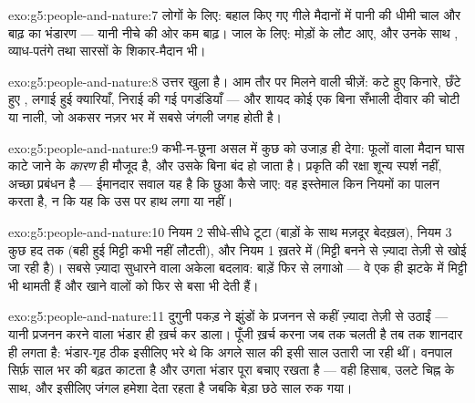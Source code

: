 \begin{solution}{exo:g5:people-and-nature:7}
लोगों के लिए: बहाल किए गए गीले मैदानों में पानी की धीमी चाल और बाढ़ का
भंडारण --- यानी नीचे की ओर कम बाढ़। जाल के लिए: मोड़ों के  लौट आए,
और उनके साथ , व्याध-पतंगे तथा सारसों के शिकार-मैदान भी।
\end{solution}

\begin{solution}{exo:g5:people-and-nature:8}
उत्तर खुला है। आम तौर पर मिलने वाली चीज़ें: कटे हुए किनारे, छँटे हुए
, लगाई हुई क्यारियाँ, निराई की गई पगडंडियाँ --- और शायद कोई एक बिना
सँभाली दीवार की चोटी या नाली, जो अकसर नज़र भर में सबसे जंगली जगह होती
है।
\end{solution}

\begin{solution}{exo:g5:people-and-nature:9}
कभी-न-छूना असल में कुछ  को उजाड़ ही देगा: फूलों वाला मैदान घास
काटे जाने के \emph{कारण} ही मौजूद है, और उसके बिना बंद हो जाता है।
प्रकृति की रक्षा शून्य स्पर्श नहीं, अच्छा प्रबंधन है --- ईमानदार सवाल
यह है कि छुआ कैसे जाए: वह इस्तेमाल किन नियमों का पालन करता है, न कि यह
कि उस पर हाथ लगा या नहीं।
\end{solution}

\begin{solution}{exo:g5:people-and-nature:10}
नियम 2 सीधे-सीधे टूटा (बाड़ों के साथ मज़दूर बेदख़ल), नियम 3 कुछ हद तक
(बही हुई मिट्टी कभी नहीं लौटती), और नियम 1 ख़तरे में (मिट्टी बनने से
ज़्यादा तेज़ी से खोई जा रही है)। सबसे ज़्यादा सुधारने वाला अकेला बदलाव:
बाड़ें फिर से लगाओ --- वे एक ही झटके में मिट्टी भी थामती हैं और 
खाने वालों को फिर से बसा भी देती हैं।
\end{solution}

\begin{solution}{exo:g5:people-and-nature:11}
दुगुनी पकड़ ने  झुंडों के प्रजनन से कहीं ज़्यादा तेज़ी से उठाईं
--- यानी प्रजनन करने वाला भंडार ही ख़र्च कर डाला। पूँजी ख़र्च करना जब
तक चलती है तब तक शानदार ही लगता है: भंडार-गृह ठीक इसीलिए भरे थे कि अगले
साल की  इसी साल उतारी जा रही थीं। वनपाल सिर्फ़ साल भर की बढ़त
काटता है और उगता भंडार पूरा बचाए रखता है --- वही हिसाब, उलटे चिह्न के
साथ, और इसीलिए जंगल हमेशा देता रहता है जबकि बेड़ा छठे साल रुक गया।
\end{solution}
